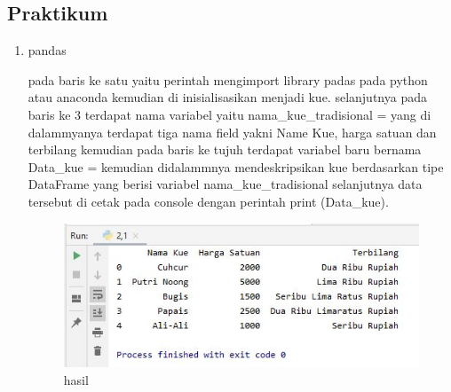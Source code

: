 \subsection{Praktikum}
\begin{enumerate}
\item pandas \par
pada baris ke satu yaitu perintah mengimport library padas pada python atau anaconda kemudian di inisialisasikan menjadi kue. selanjutnya pada baris ke 3 terdapat nama variabel yaitu nama\_kue\_tradisional = yang di dalammyanya terdapat tiga nama field yakni Name Kue, harga satuan dan terbilang kemudian pada baris ke tujuh terdapat variabel baru bernama Data\_kue = kemudian didalammnya mendeskripsikan kue berdasarkan tipe DataFrame yang berisi variabel nama\_kue\_tradisional selanjutnya data tersebut di cetak pada console dengan perintah print (Data\_kue).

\begin{figure}[ht]
\centering
\includegraphics[scale=0.5]{figures/1174042/chapter3/2,1.JPG}
\caption{hasil}
\label{contoh}
\end{figure}


\end{enumerate}
